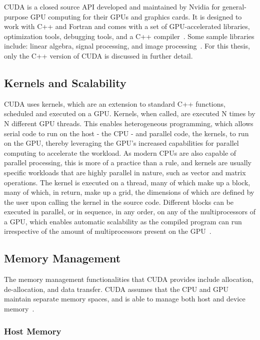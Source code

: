  CUDA is a closed source API developed and maintained by Nvidia for general-purpose GPU computing for their GPUs and graphics cards. It is designed to work with C++ and Fortran and comes with a set of GPU-accelerated libraries, optimization tools, debugging tools, and a C++ compiler~\cite{nvidia_cuda_2017}. Some sample libraries include: linear algebra, signal processing, and image processing~\cite{nvidia_cuda_2020}. For this thesis, only the C++ version of CUDA is discussed in further detail.
 
 
 \subsection{Kernels and Scalability}
 CUDA uses kernels, which are an extension to standard C++ functions, scheduled and executed on a GPU. Kernels, when called, are executed N times by N different GPU threads. This enables heterogeneous programming, which allows serial code to run on the host - the CPU - and parallel code, the kernels, to run on the GPU, thereby leveraging the GPU's increased capabilities for parallel computing to accelerate the workload. As modern CPUs are also capable of parallel processing, this is more of a practice than a rule, and kernels are usually specific workloads that are highly parallel in nature, such as vector and matrix operations. The kernel is executed on a thread, many of which make up a block, many of which, in return, make up a grid, the dimensions of which are defined by the user upon calling the kernel in the source code. Different blocks can be executed in parallel, or in sequence, in any order, on any of the multiprocessors of a GPU, which enables automatic scalability as the compiled program can run irrespective of the amount of multiprocessors present on the GPU~\cite{nvidia_cuda_2022}.
 
 
 \subsection{Memory Management}
 The memory management functionalities that CUDA provides include allocation, de-allocation, and data transfer. CUDA assumes that the CPU and GPU maintain separate memory spaces, and is able to manage both host and device memory~\cite{nvidia_cuda_2022}.
 
 \subsubsection{Host Memory}
 \label{sec:hostMem}
 
